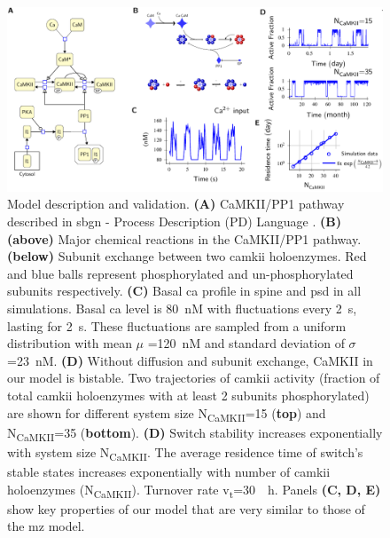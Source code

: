 \documentclass[9pt,lineno,doublespacing]{elife}
\newcommand\SUB[2]{#1\textsubscript{#2}}
\begin{document}
\begin{figure}[t]%
    \includegraphics[width=0.95\linewidth]{./PaperFigures/elifeFigure1/figure_validation_178mm.pdf}
    \caption{Model description and validation. \textbf{(A)} CaMKII/PP1
        pathway described in \gls{sbgn} - Process Description (PD) Language \citep{novere_systems_2009}. 
        \textbf{(B)} \textbf{(above)} Major chemical reactions in the CaMKII/PP1 pathway. 
        \textbf{(below)} Subunit exchange between two \gls{camkii} holoenzymes. Red
        and blue balls represent phosphorylated and un-phosphorylated subunits
        respectively.  \textbf{(C)} Basal \gls{ca} profile in spine and
        \gls{psd} in all simulations. Basal \gls{ca} level is \SI{80}{\nano M} with fluctuations
        every \SI{2}{\second}, lasting for \SI{2}{\second}. These fluctuations are sampled from a uniform
        distribution with mean $\mu$ =\SI{120}{\nano M} and
        standard deviation of $\sigma$=\SI{23}{\nano M}.
        \textbf{(D)} Without diffusion and subunit exchange, CaMKII in our model is bistable.
        Two trajectories of \gls{camkii} activity (fraction of total \gls{camkii}
        holoenzymes with at least 2 subunits phosphorylated) are shown for different system
        size \SUB{N}{CaMKII}=15 (\textbf{top}) and \SUB{N}{CaMKII}=35 (\textbf{bottom}).
        \textbf{(D)} Switch stability increases exponentially with system size \SUB{N}{CaMKII}. The 
        average residence time of  switch's stable states increases exponentially
        with number of \gls{camkii} holoenzymes (\SUB{N}{CaMKII}). Turnover
        rate \SUB{v}{t}=\SI{30}{\per \hour}. Panels \textbf{(C, D, E)} show key
        properties of our model that are very similar to those of the \gls{mz} 
        model.}\label{fig:validation} 
\end{figure}
\end{document}
